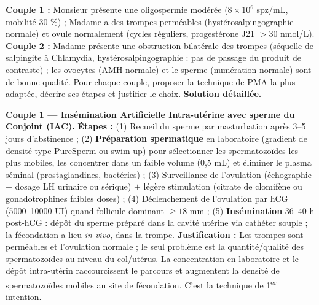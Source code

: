 \documentclass[11pt]{article}
\begin{document}
\begin{exoresolu}
\textbf{Couple 1 :} Monsieur présente une oligospermie modérée ($8 \times 10^6$ spz/mL, mobilité 30 \%) ; Madame a des trompes perméables (hystérosalpingographie normale) et ovule normalement (cycles réguliers, progestérone J21 $> 30$ nmol/L).
\textbf{Couple 2 :} Madame présente une obstruction bilatérale des trompes (séquelle de salpingite à Chlamydia, hystérosalpingographie : pas de passage du produit de contraste) ; les ovocytes (AMH normale) et le sperme (numération normale) sont de bonne qualité.
Pour chaque couple, proposer la technique de PMA la plus adaptée, décrire ses étapes et justifier le choix.
\tcblower
\textbf{Solution détaillée.}

\textbf{Couple 1 — Insémination Artificielle Intra-utérine avec sperme du Conjoint (IAC).}
\textbf{Étapes :} (1) Recueil du sperme par masturbation après 3--5 jours d'abstinence ; (2) \textbf{Préparation spermatique} en laboratoire (gradient de densité type PureSperm ou swim-up) pour sélectionner les spermatozoïdes les plus mobiles, les concentrer dans un faible volume (0,5 mL) et éliminer le plasma séminal (prostaglandines, bactéries) ; (3) Surveillance de l'ovulation (échographie + dosage LH urinaire ou sérique) $\pm$ légère stimulation (citrate de clomifène ou gonadotrophines faibles doses) ; (4) Déclenchement de l'ovulation par hCG (5000--10000 UI) quand follicule dominant $\ge 18$ mm ; (5) \textbf{Insémination} 36--40 h post-hCG : dépôt du sperme préparé dans la cavité utérine via cathéter souple ; la fécondation a lieu \emph{in vivo}, dans la trompe.
\textbf{Justification :} Les trompes sont perméables et l'ovulation normale ; le seul problème est la quantité/qualité des spermatozoïdes au niveau du col/utérus. La concentration en laboratoire et le dépôt intra-utérin raccourcissent le parcours et augmentent la densité de spermatozoïdes mobiles au site de fécondation. C'est la technique de 1\textsuperscript{er} intention.


\end{exoresolu}
\end{document}
